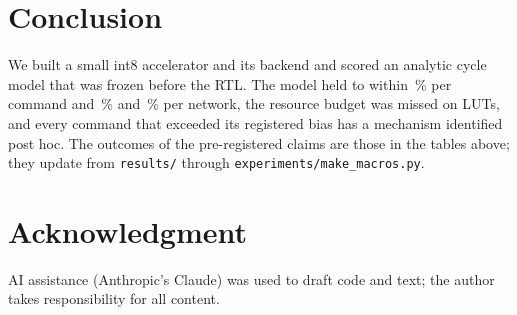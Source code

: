 \documentclass[conference]{IEEEtran}
\begin{document}
\section{Conclusion}
We built a small int8 accelerator and its backend and scored an analytic cycle model that was frozen before the RTL. The model held to within \MeasCfourMaxErr\,\% per command and \MeasCfourBErrMnist\,\% and \MeasCfourBErrCifar\,\% per network, the resource budget was missed on LUTs, and every command that exceeded its registered bias has a mechanism identified post hoc. The outcomes of the pre-registered claims are those in the tables above; they update from \texttt{results/} through \texttt{experiments/make\_macros.py}.

\section*{Acknowledgment}
AI assistance (Anthropic's Claude) was used to draft code and text; the author takes responsibility for all content.



\end{document}
